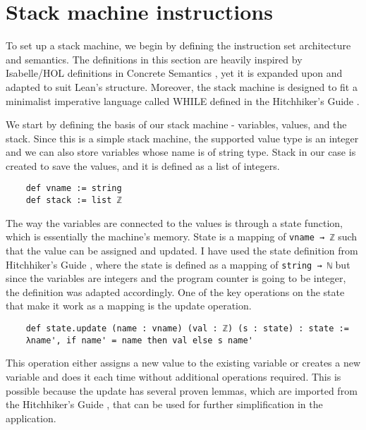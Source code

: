 \chapter{Stack machine instructions}\label{s:instr}

To set up a stack machine, we begin by defining the instruction set architecture and semantics. The definitions in this section are heavily inspired by Isabelle/HOL definitions in Concrete Semantics \cite{isabelle}, yet it is expanded upon and adapted to suit Lean's structure. Moreover, the stack machine is designed to fit a minimalist imperative language called WHILE defined in the Hitchhiker's Guide \cite{hithchiker}. 

We start by defining the basis of our stack machine - variables, values, and the stack. Since this is a simple stack machine, the supported value type is an integer and we can also store variables whose name is of string type. Stack in our case is created to save the values, and it is defined as a list of integers.
\begin{lstlisting}
    def vname := string
    def stack := list ℤ 
\end{lstlisting}

The way the variables are connected to the values is through a state function, which is essentially the machine's memory. State is a mapping of \lstinline{vname → ℤ} such that the value can be assigned and updated. I have used the state definition from Hitchhiker's Guide \cite{hithchiker}, where the state is defined as a mapping of \lstinline{string → ℕ} but since the variables are integers and the program counter is going to be integer, the definition was adapted accordingly. One of the key operations on the state that make it work as a mapping is the update operation.
\begin{lstlisting}
    def state.update (name : vname) (val : ℤ) (s : state) : state :=
    λname', if name' = name then val else s name'
\end{lstlisting}
This operation either assigns a new value to the existing variable or creates a new variable and does it each time without additional operations required. This is possible because the update has several proven lemmas, which are imported from the Hitchhiker's Guide \cite{hithchiker}, that can be used for further simplification in the application. 

